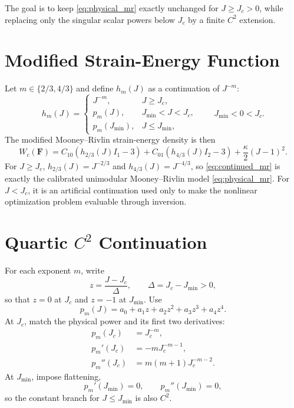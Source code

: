 \documentclass[11pt]{article}
\newcommand{\F}{\bm F}
\begin{document}
The goal is to keep \eqref{eq:physical_mr} exactly unchanged for
$J\ge J_c>0$, while replacing only the singular scalar powers below $J_c$ by a
finite $C^2$ extension.

\section{Modified Strain-Energy Function}

Let $m\in\{2/3,4/3\}$ and define $h_m(J)$ as a continuation of $J^{-m}$:
\begin{equation}
  h_m(J)=
  \begin{cases}
    J^{-m}, & J\ge J_c,\\
    p_m(J), & J_{\min}<J<J_c,\\
    p_m(J_{\min}), & J\le J_{\min},
  \end{cases}
  \qquad J_{\min}<0<J_c.
  \label{eq:hm_def}
\end{equation}
The modified Mooney--Rivlin strain-energy density is then
\begin{equation}
  \boxed{
  W_c(\F)
  =
  C_{10}\left(h_{2/3}(J) I_1 - 3\right)
  +
  C_{01}\left(h_{4/3}(J) I_2 - 3\right)
  +
  \frac{\kappa}{2}(J-1)^2.
  }
  \label{eq:continued_mr}
\end{equation}
For $J\ge J_c$, $h_{2/3}(J)=J^{-2/3}$ and
$h_{4/3}(J)=J^{-4/3}$, so \eqref{eq:continued_mr} is exactly the calibrated
unimodular Mooney--Rivlin model \eqref{eq:physical_mr}. For $J<J_c$, it is an
artificial continuation used only to make the nonlinear optimization problem
evaluable through inversion.

\section{\texorpdfstring{Quartic $C^2$ Continuation}{Quartic C2 Continuation}}

For each exponent $m$, write
\begin{equation}
  z=\frac{J-J_c}{\Delta},
  \qquad
  \Delta=J_c-J_{\min}>0,
\end{equation}
so that $z=0$ at $J_c$ and $z=-1$ at $J_{\min}$. Use
\begin{equation}
  p_m(J)=a_0+a_1z+a_2z^2+a_3z^3+a_4z^4.
\end{equation}
At $J_c$, match the physical power and its first two derivatives:
\begin{align}
  p_m(J_c) &= J_c^{-m},\\
  p_m'(J_c) &= -mJ_c^{-m-1},\\
  p_m''(J_c) &= m(m+1)J_c^{-m-2}.
\end{align}
At $J_{\min}$, impose flattening,
\begin{equation}
  p_m'(J_{\min})=0,
  \qquad
  p_m''(J_{\min})=0,
\end{equation}
so the constant branch for $J\le J_{\min}$ is also $C^2$.
\end{document}
